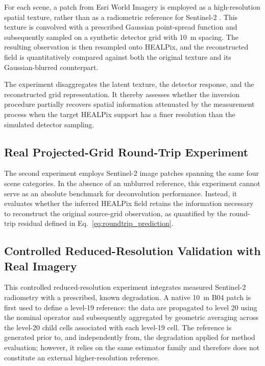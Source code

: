 \documentclass[journal]{IEEEtran}
\newcommand{\healpix}{HEALPix\xspace}
\begin{document}
For each scene, a patch from Esri World Imagery is employed as a high-resolution spatial texture, rather than as a radiometric reference for Sentinel-2 \cite{esri_world_imagery}. This texture is convolved with a prescribed Gaussian point-spread function and subsequently sampled on a synthetic detector grid with 10~m spacing. The resulting observation is then resampled onto \healpix, and the reconstructed field is quantitatively compared against both the original texture and its Gaussian-blurred counterpart.

The experiment disaggregates the latent texture, the detector response, and the reconstructed grid representation. It thereby assesses whether the inversion procedure partially recovers spatial information attenuated by the measurement process when the target \healpix support has a finer resolution than the simulated detector sampling.


\subsection{Real Projected-Grid Round-Trip Experiment}
\label{sec:roundtrip_experiment}

The second experiment employs Sentinel-2 image patches spanning the same four scene categories. In the absence of an unblurred reference, this experiment cannot serve as an absolute benchmark for deconvolution performance. Instead, it evaluates whether the inferred \healpix field retains the information necessary to reconstruct the original source-grid observation, as quantified by the round-trip residual defined in Eq.~\eqref{eq:roundtrip_prediction}.


\subsection{Controlled Reduced-Resolution Validation with Real Imagery}
\label{sec:real_downscale_experiment}

This controlled reduced-resolution experiment integrates measured Sentinel-2 radiometry with a prescribed, known degradation. A native 10~m B04 patch is first used to define a level-19 reference: the data are propagated to level 20 using the nominal operator and subsequently aggregated by geometric averaging across the level-20 child cells associated with each level-19 cell. The reference is generated prior to, and independently from, the degradation applied for method evaluation; however, it relies on the same estimator family and therefore does not constitute an external higher-resolution reference.
\end{document}
